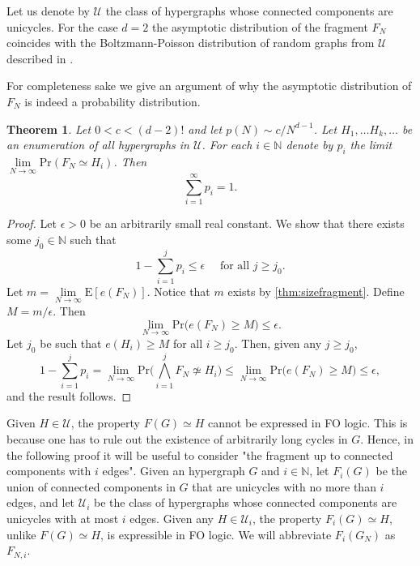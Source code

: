 \documentclass[11pt,notitlepage,a4paper]{article}
\newtheorem{theorem}{Theorem}[section]
\theoremstyle{definition}
\newcommand{\N}{\mathbb{N}}
\newcommand{\LN}{\lim\limits_{N\to \infty}}
\begin{document}
Let us denote by $\mathcal{U}$ the class of hypergraphs
whose connected components are unicycles. For the case $d=2$ 
the asymptotic distribution of the fragment $F_N$ coincides with
the Boltzmann-Poisson distribution of random graphs from $\mathcal{U}$
described in \cite{mcdiarmid2009random}.
\par
For completeness sake we give an argument of why the asymptotic distribution
of $F_N$ is indeed a probability distribution.  



\begin{theorem} \label{thm:limitdistribution}
	Let $0<c<(d-2)!$ and let $p(N)\sim c/N^{d-1}$. 
	Let $H_1, \dots H_k, \dots$ be an enumeration of all hypergraphs
	in $\mathcal{U}$. For each $i\in \N$ 
	denote by $p_i$ the limit $\LN \mathrm{Pr}(F_N \simeq H_i)$. Then
	\[
	\sum_{i=1}^\infty p_i = 1.	
	\]
\end{theorem}
\begin{proof}
	Let $\epsilon>0$ be an arbitrarily small real constant. We show that 
	there exists some $j_0\in \N$ such that
	\[
	1- \sum_{i=1}^j p_i \leq \epsilon \quad \text{ for all } j\geq j_0.	
	\]	
	Let $m=\LN \mathrm{E}[e(F_N)]$. Notice that $m$ exists by \cref{thm:sizefragment}.
	Define $M=m/\epsilon$. Then 
	\[
	\LN \mathrm{Pr}\big(e(F_N)\geq M\big)\leq \epsilon.
	\]
	Let $j_0$ be such that $e(H_i)\geq M$ for all $i\geq j_0$. 
	Then, given any $j\geq j_0$, 
	\[
	1 - \sum_{i=1}^j p_i = \LN \mathrm{Pr}\big(
	\bigwedge_{i=1}^j F_N \not\simeq H_i\big) \leq
	\LN \mathrm{Pr}\big(
	e(F_N) \geq M \big)\leq \epsilon, 	
	\]	
	and the result follows. 
\end{proof}

Given $H\in \mathcal{U}$, the property
$F(G)\simeq H$ cannot be expressed in FO logic. This is
because one has to rule out the existence of arbitrarily 
long cycles in $G$. Hence, in the following proof 
it will be useful to consider "the fragment up
to connected components with $i$ edges".
Given an hypergraph $G$ and $i\in \N$, let $F_i(G)$
be the union of connected components
in $G$ that are unicycles with no more than $i$ edges, and let
$\mathcal{U}_i$ be the class of hypergraphs whose connected components
are unicycles with at most $i$ edges. 
Given any $H\in \mathcal{U}_i$, the property $F_i(G)\simeq H$, 
unlike $F(G)\simeq H$, is expressible in FO logic. We will 
abbreviate $F_i(G_N)$ as $F_{N,i}$. 
\end{document}
